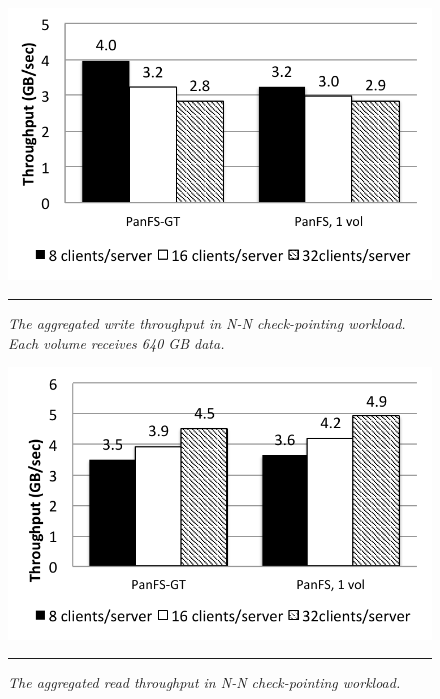 \begin{figure}[t]  %
\centerline{\includegraphics[scale=0.7]{./figs/checkpointing_write}}
\vspace{10pt}
\caption{
\textit{
The aggregated write throughput in N-N check-pointing workload.
Each volume receives 640 GB data.
}
}
\hrule
\label{graph:checkpoint_write}
\end{figure}       %

\begin{figure}[t]  %
\centerline{\includegraphics[scale=0.7]{./figs/checkpointing_read}}
\vspace{10pt}
\caption{
\textit{
The aggregated read throughput in N-N check-pointing workload.
}
}
\hrule
\label{graph:checkpoint_read}
\end{figure}       %

